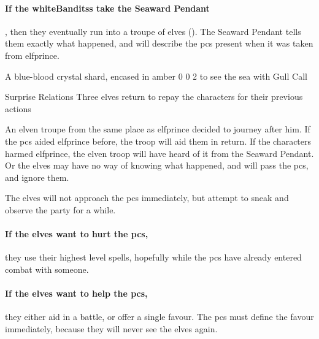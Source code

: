 \paragraph{If the \glspl{whiteBandits} take the Seaward Pendant},
then they eventually run into a troupe of elves ().
The Seaward Pendant tells them exactly what happened, and will describe the \glspl{pc} present when it was taken from \gls{elfprince}.

  {A blue-blood crystal shard, encased in amber}%
  {0}%
  {0}%
  {2}%
  {to see the sea with }%
  {Gull Call}%
  {
    \setcounter{Water}{3}
    \setcounter{Vigilance}{2}
    \setcounter{Performance}{1}
    \setcounter{Survival}{1}
  }%

\showStdSpells

{\squash Surprise Relations}%
{Three elves return to repay the characters for their previous actions}%
\label{karmaElves}

An elven troupe from the same place as \gls{elfprince} decided to journey after him.
If the \glspl{pc} aided \gls{elfprince} before, the troop will aid them in return.
If the characters harmed \gls{elfprince}, the elven troop will have heard of it from the Seaward Pendant.
Or the elves may have no way of knowing what happened, and will pass the \glspl{pc}, and ignore them.

The elves will not approach the \glspl{pc} immediately, but attempt to sneak and observe the party for a while.

\paragraph{If the elves want to hurt the \glspl{pc},}
they use their highest level spells, hopefully while the \glspl{pc} have already entered combat with someone.

\paragraph{If the elves want to help the \glspl{pc},}
they either aid in a battle, or offer a single favour.
The \glspl{pc} must define the favour immediately, because they will never see the elves again.


